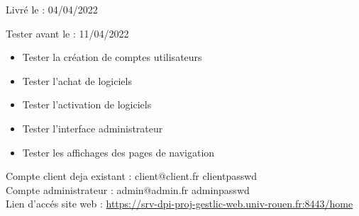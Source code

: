 \documentclass{article}
\begin{document}
Livré le : 04/04/2022

Tester avant le : 11/04/2022\\

\begin{itemize}
     \item Tester la création de comptes utilisateurs
     \item Tester l'achat de logiciels
     \item Tester l'activation de logiciels
     \item Tester l'interface administrateur
     \item Tester les affichages des pages de navigation\newline
\end{itemize}
Compte client deja existant : client@client.fr clientpasswd\\
Compte administrateur : admin@admin.fr adminpasswd\\

Lien d'accés site web : \href{https://srv-dpi-proj-gestlic-web.univ-rouen.fr:8443/home}{https://srv-dpi-proj-gestlic-web.univ-rouen.fr:8443/home}
\end{document}
